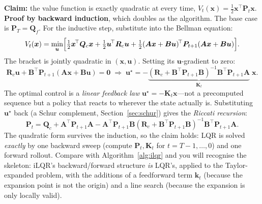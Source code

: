 \documentclass[11pt,twoside]{report}
\theoremstyle{definition}
\theoremstyle{plain}
\theoremstyle{remark}
\newcommand{\x}{\bm{x}}
\newcommand{\uu}{\bm{u}}
\newcommand{\0}{\bm{0}}
\begin{document}
\textbf{Claim:} the value function is exactly quadratic at every time,
$V_{t}(\x)=\tfrac12\x^{\!\top}\bm{P}_{t}\x$.
\textbf{Proof by backward induction}, which doubles as the algorithm.
The base case is $\bm{P}_{T}=\bm{Q}_{f}$. For the inductive step,
substitute into the Bellman equation:
\begin{equation*}
V_{t}(\x)=\min_{\uu}\Bigl[
\tfrac12\x^{\!\top}\bm{Q}_{c}\x+\tfrac12\uu^{\!\top}\bm{R}_{c}\uu
+\tfrac12(\bm{A}\x+\bm{B}\uu)^{\!\top}\bm{P}_{t+1}(\bm{A}\x+\bm{B}\uu)
\Bigr].
\end{equation*}
The bracket is jointly quadratic in $(\x,\uu)$. Setting its
$\uu$-gradient to zero:
\begin{equation*}
\bm{R}_{c}\uu+\bm{B}^{\!\top}\bm{P}_{t+1}(\bm{A}\x+\bm{B}\uu)=\0
\;\Longrightarrow\;
\uu^{\star}=-\underbrace{(\bm{R}_{c}+\bm{B}^{\!\top}\bm{P}_{t+1}\bm{B})^{-1}
\bm{B}^{\!\top}\bm{P}_{t+1}\bm{A}}_{\displaystyle\bm{K}_{t}}\;\x.
\end{equation*}
The optimal control is a \emph{linear feedback law}
$\uu^{\star}=-\bm{K}_{t}\x$---not a precomputed sequence but a policy
that reacts to wherever the state actually is.
Substituting $\uu^{\star}$ back (a Schur complement,
Section~\ref{sec:schur}) gives the \emph{Riccati recursion}:
\begin{equation}\label{eq:riccati}
\boxed{
\bm{P}_{t}=\bm{Q}_{c}+\bm{A}^{\!\top}\bm{P}_{t+1}\bm{A}
-\bm{A}^{\!\top}\bm{P}_{t+1}\bm{B}
(\bm{R}_{c}+\bm{B}^{\!\top}\bm{P}_{t+1}\bm{B})^{-1}
\bm{B}^{\!\top}\bm{P}_{t+1}\bm{A}.
}
\end{equation}
The quadratic form survives the induction, so the claim holds:
LQR is solved \emph{exactly} by one backward sweep
(compute $\bm{P}_{t},\bm{K}_{t}$ for $t=T{-}1,\ldots,0$) and one forward
rollout. Compare with Algorithm~\ref{alg:ilqr} and you will recognise
the skeleton: iLQR's backward/forward structure \emph{is} LQR's, applied
to the Taylor-expanded problem, with the additions of a feedforward term
$\bm{k}_{t}$ (because the expansion point is not the origin) and a line
search (because the expansion is only locally valid).
\end{document}
